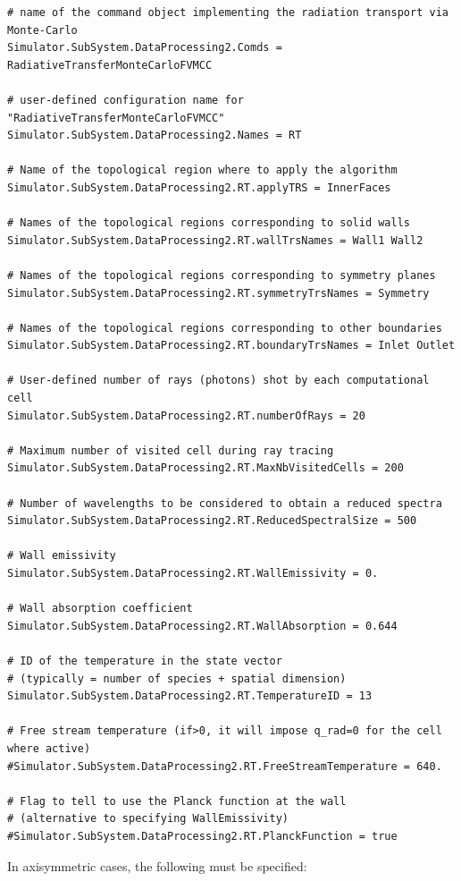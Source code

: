 \documentclass[11pt]{article}
\begin{document}
\begin{verbatim}
# name of the command object implementing the radiation transport via Monte-Carlo
Simulator.SubSystem.DataProcessing2.Comds = RadiativeTransferMonteCarloFVMCC

# user-defined configuration name for "RadiativeTransferMonteCarloFVMCC"
Simulator.SubSystem.DataProcessing2.Names = RT

# Name of the topological region where to apply the algorithm
Simulator.SubSystem.DataProcessing2.RT.applyTRS = InnerFaces

# Names of the topological regions corresponding to solid walls
Simulator.SubSystem.DataProcessing2.RT.wallTrsNames = Wall1 Wall2

# Names of the topological regions corresponding to symmetry planes
Simulator.SubSystem.DataProcessing2.RT.symmetryTrsNames = Symmetry

# Names of the topological regions corresponding to other boundaries
Simulator.SubSystem.DataProcessing2.RT.boundaryTrsNames = Inlet Outlet

# User-defined number of rays (photons) shot by each computational cell 
Simulator.SubSystem.DataProcessing2.RT.numberOfRays = 20

# Maximum number of visited cell during ray tracing
Simulator.SubSystem.DataProcessing2.RT.MaxNbVisitedCells = 200

# Number of wavelengths to be considered to obtain a reduced spectra 
Simulator.SubSystem.DataProcessing2.RT.ReducedSpectralSize = 500

# Wall emissivity 
Simulator.SubSystem.DataProcessing2.RT.WallEmissivity = 0.

# Wall absorption coefficient 
Simulator.SubSystem.DataProcessing2.RT.WallAbsorption = 0.644

# ID of the temperature in the state vector 
# (typically = number of species + spatial dimension)
Simulator.SubSystem.DataProcessing2.RT.TemperatureID = 13

# Free stream temperature (if>0, it will impose q_rad=0 for the cell where active)
#Simulator.SubSystem.DataProcessing2.RT.FreeStreamTemperature = 640.

# Flag to tell to use the Planck function at the wall 
# (alternative to specifying WallEmissivity)
#Simulator.SubSystem.DataProcessing2.RT.PlanckFunction = true
\end{verbatim}

In axisymmetric cases, the following must be specified:
 
\end{document}
